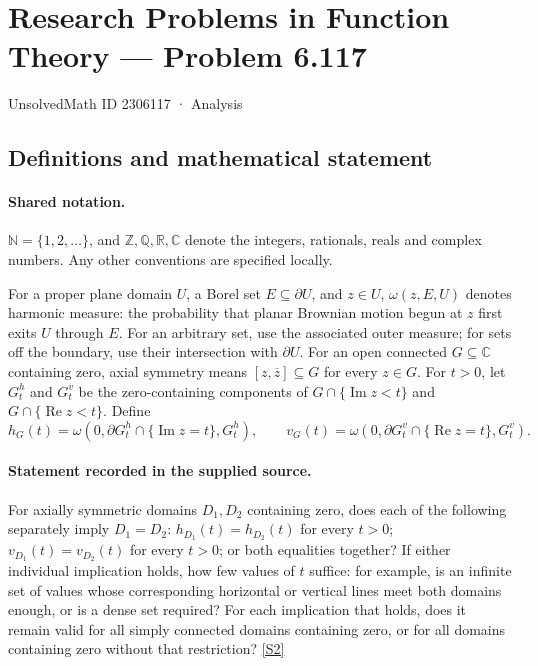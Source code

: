 \documentclass[11pt]{article}
\newcommand{\sref}[2]{\hyperlink{source:#1:#2}{[S#2]}}
\begin{document}
\setcounter{section}{2306116}
\section{Research Problems in Function Theory — Problem 6.117}\label{2306117}
{\small\sffamily UnsolvedMath ID 2306117 · Analysis}
\subsection{Definitions and mathematical statement}

\paragraph{Shared notation.}$\mathbb N=\{1,2,\ldots\}$, and $\mathbb Z,\mathbb Q,\mathbb R,\mathbb C$ denote the integers, rationals, reals and complex numbers. Any other conventions are specified locally.


For a proper plane domain $U$, a Borel set $E\subseteq\partial U$, and $z\in U$, $\omega(z,E,U)$ denotes harmonic measure: the probability that planar Brownian motion begun at $z$ first exits $U$ through $E$. For an arbitrary set, use the associated outer measure; for sets off the boundary, use their intersection with $\partial U$.
For an open connected $G\subseteq\mathbb C$ containing zero, axial symmetry means $[z,\overline z]\subseteq G$ for every $z\in G$. For $t>0$, let $G_t^h$ and $G_t^v$ be the zero-containing components of $G\cap\{\operatorname{Im}z<t\}$ and $G\cap\{\operatorname{Re}z<t\}$. Define
\[h_G(t)=\omega(0,\partial G_t^h\cap\{\operatorname{Im}z=t\},G_t^h),\qquad
v_G(t)=\omega(0,\partial G_t^v\cap\{\operatorname{Re}z=t\},G_t^v).\]
\paragraph{Statement recorded in the supplied source.}
For axially symmetric domains $D_1,D_2$ containing zero, does each of the following separately imply $D_1=D_2$: $h_{D_1}(t)=h_{D_2}(t)$ for every $t>0$; $v_{D_1}(t)=v_{D_2}(t)$ for every $t>0$; or both equalities together? If either individual implication holds, how few values of $t$ suffice: for example, is an infinite set of values whose corresponding horizontal or vertical lines meet both domains enough, or is a dense set required? For each implication that holds, does it remain valid for all simply connected domains containing zero, or for all domains containing zero without that restriction? \sref{2306117}{2}
\end{document}
